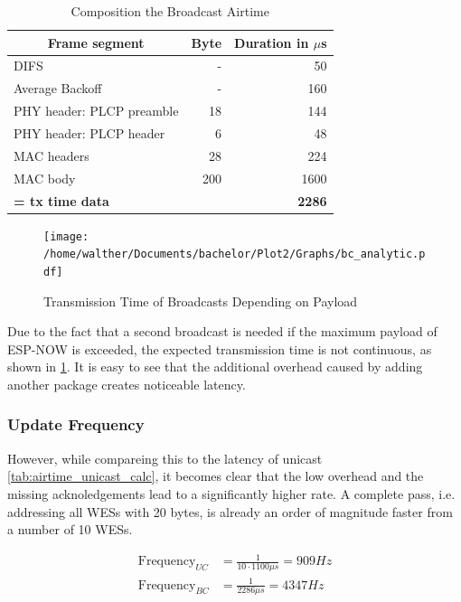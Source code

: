 \begin{table}[h]
	\centering
	\begin{tabular} { lrr }
		\toprule
		\multicolumn{1}{c}{Frame segment}
		& \multicolumn{1}{c}{Byte}
		& \multicolumn{1}{c}{Duration in $\mu$s} \\
		\midrule
		DIFS								& -		& 50 \\
		Average Backoff						& -		& 160 \\
		PHY header: PLCP preamble			& 18	& 144 \\
		PHY header: PLCP header				& 6 	& 48 \\
		MAC headers							& 28	& 224 \\
		MAC body							& 200 	& 1600 \\
		\textbf{= tx time data}				& 		& \textbf{2286} \\
		\bottomrule
	\end{tabular}
	\caption{Composition the Broadcast Airtime}
	\label{tab:airtime_broadcast_calc}
\end{table}

\begin{figure}[h]
	\centering
	\texttt{[image: /home/walther/Documents/bachelor/Plot2/Graphs/bc\_analytic.pdf]}
	\caption{Transmission Time of Broadcasts Depending on Payload}
	\label{fig:bc_analytic}
\end{figure}

Due to the fact that a second broadcast is needed if the maximum payload of ESP-NOW is exceeded,
the expected transmission time is not continuous, as shown in \cref{fig:bc_analytic}.
It is easy to see that the additional overhead caused by adding another package creates noticeable latency.

\subsubsection*{Update Frequency}

However, while compareing this to the latency of unicast \ref{tab:airtime_unicast_calc},
it becomes clear that the low overhead and the missing acknoledgements lead to a significantly higher rate.
A complete pass, i.e. addressing all WESs with 20 bytes, is already an order of magnitude faster from a number of 10 WESs.

\begin{align}
	\text{Frequency}_{UC} &= \frac{1}{10 \cdot 1100\mu s} = 909 Hz \\
	\text{Frequency}_{BC} &= \frac{1}{2286\mu s} = 4347 Hz
\end{align}

